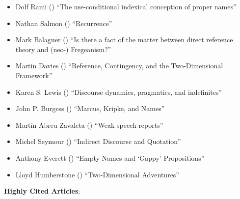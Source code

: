 \documentclass[
  10pt,
  letterpaper,
  DIV=11,
  numbers=noendperiod,
  twoside]{scrartcl}
\providecommand{\tightlist}{%
  \setlength{\itemsep}{0pt}\setlength{\parskip}{0pt}}\usepackage{longtable,booktabs,array}
\begin{document}
\begin{itemize}
\tightlist
\item
  Dolf Rami () ``The
  use-conditional indexical conception of proper names''
\item
  Nathan Salmon () ``Recurrence''
\item
  Mark Balaguer () ``Is there a
  fact of the matter between direct reference theory and (neo-)
  Fregeanism?''
\item
  Martin Davies () ``Reference,
  Contingency, and the Two-Dimensional Framework''
\item
  Karen S. Lewis () ``Discourse
  dynamics, pragmatics, and indefinites''
\item
  John P. Burgess () ``Marcus,
  Kripke, and Names''
\item
  Martín Abreu Zavaleta () ``Weak
  speech reports''
\item
  Michel Seymour () ``Indirect
  Discourse and Quotation''
\item
  Anthony Everett () ``Empty
  Names and `Gappy' Propositions''
\item
  Lloyd Humberstone ()
  ``Two-Dimensional Adventures''
\end{itemize}

\textbf{Highly Cited Articles}:
\end{document}
